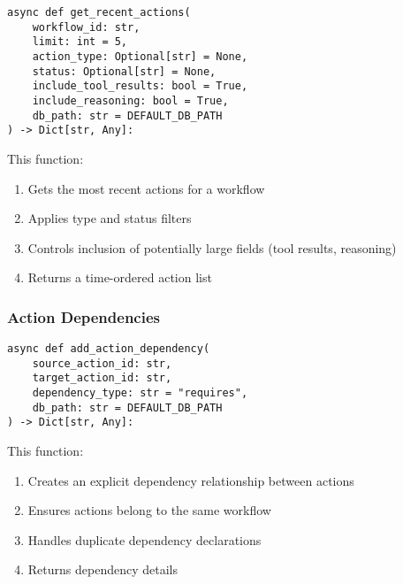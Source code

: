 \documentclass[12pt,a4paper]{article}
\begin{document}
\begin{pageablecode}
\begin{verbatim}
async def get_recent_actions(
    workflow_id: str,
    limit: int = 5,
    action_type: Optional[str] = None,
    status: Optional[str] = None,
    include_tool_results: bool = True,
    include_reasoning: bool = True,
    db_path: str = DEFAULT_DB_PATH
) -> Dict[str, Any]:
\end{verbatim}
\end{pageablecode}
This function:
\begin{enumerate}[label=\arabic*.]
    \item Gets the most recent actions for a workflow
    \item Applies type and status filters
    \item Controls inclusion of potentially large fields (tool results, reasoning)
    \item Returns a time-ordered action list
\end{enumerate}

\subsubsection*{Action Dependencies}
\begin{pageablecode}
\begin{verbatim}
async def add_action_dependency(
    source_action_id: str,
    target_action_id: str,
    dependency_type: str = "requires",
    db_path: str = DEFAULT_DB_PATH
) -> Dict[str, Any]:
\end{verbatim}
\end{pageablecode}
This function:
\begin{enumerate}[label=\arabic*.]
    \item Creates an explicit dependency relationship between actions
    \item Ensures actions belong to the same workflow
    \item Handles duplicate dependency declarations
    \item Returns dependency details
\end{enumerate}
\end{document}
